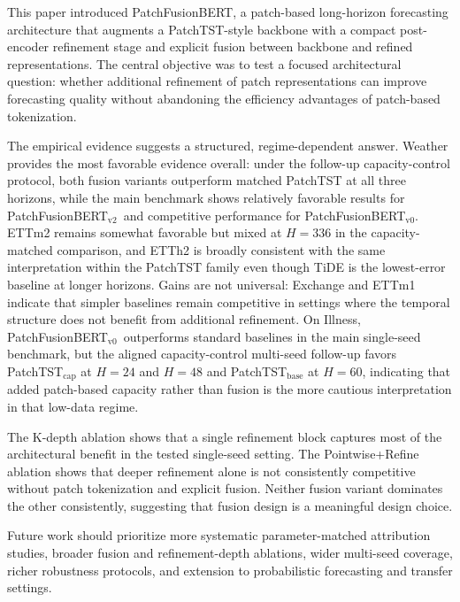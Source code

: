 \documentclass{ieeeaccess}
\newcommand{\model}{PatchFusionBERT\xspace}
\newcommand{\modelvzero}{PatchFusionBERT$_{\text{v0}}$\xspace}
\newcommand{\modelvtwo}{PatchFusionBERT$_{\text{v2}}$\xspace}
\begin{document}
This paper introduced \model, a patch-based long-horizon forecasting architecture
that augments a PatchTST-style backbone with a compact post-encoder refinement stage
and explicit fusion between backbone and refined representations. The central objective
was to test a focused architectural question: whether additional refinement of patch
representations can improve forecasting quality without abandoning the efficiency
advantages of patch-based tokenization.

The empirical evidence suggests a structured, regime-dependent
answer. Weather provides the most favorable evidence overall: under the follow-up
capacity-control protocol, both fusion variants outperform matched PatchTST at all
three horizons, while the main benchmark shows relatively favorable results for
\modelvtwo\ and competitive performance for \modelvzero. ETTm2
remains somewhat favorable but mixed at $H=336$ in the capacity-matched comparison, and ETTh2
is broadly consistent with the same interpretation within the PatchTST family even though TiDE is the
lowest-error baseline at longer horizons. Gains are not universal: Exchange and
ETTm1 indicate that simpler baselines remain competitive in settings where the
temporal structure does not benefit from additional refinement. On Illness,
\modelvzero\ outperforms standard baselines in the main single-seed benchmark, but
the aligned capacity-control multi-seed follow-up favors PatchTST$_\text{cap}$ at
$H=24$ and $H=48$ and PatchTST$_\text{base}$ at $H=60$, indicating that added
patch-based capacity rather than fusion is the more cautious interpretation in that
low-data regime.

The K-depth ablation shows that a single refinement block captures most of the
architectural benefit in the tested single-seed setting. The Pointwise+Refine
ablation shows that deeper refinement alone is not consistently competitive without
patch tokenization and explicit fusion. Neither fusion variant dominates the other consistently,
suggesting that fusion design is a meaningful design choice.

Future work should prioritize more systematic parameter-matched attribution studies,
broader fusion and refinement-depth ablations, wider multi-seed coverage, richer
robustness protocols, and extension to probabilistic forecasting and transfer settings.

\FloatBarrier
\end{document}
